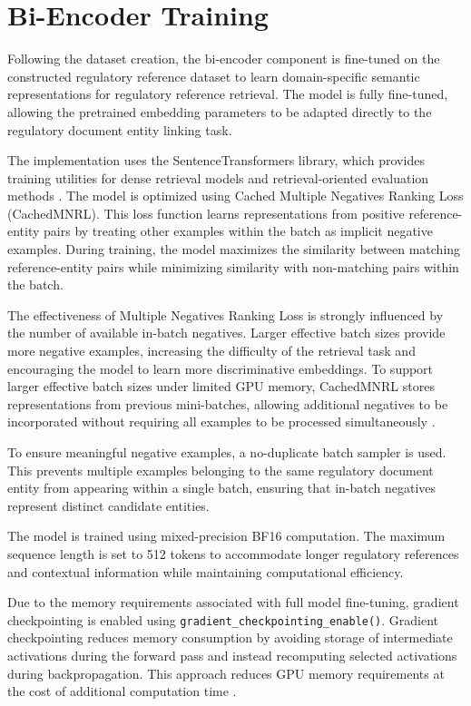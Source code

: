 \section{Bi-Encoder Training}

Following the dataset creation, the bi-encoder component is fine-tuned on the constructed regulatory reference dataset to learn domain-specific semantic representations for regulatory reference retrieval. The model is fully fine-tuned, allowing the pretrained embedding parameters to be adapted directly to the regulatory document entity linking task.

The implementation uses the SentenceTransformers library, which provides training utilities for dense retrieval models and retrieval-oriented evaluation methods \cite{reimers2019sentence}. The model is optimized using Cached Multiple Negatives Ranking Loss (CachedMNRL). This loss function learns representations from positive reference-entity pairs by treating other examples within the batch as implicit negative examples. During training, the model maximizes the similarity between matching reference-entity pairs while minimizing similarity with non-matching pairs within the batch.

The effectiveness of Multiple Negatives Ranking Loss is strongly influenced by the number of available in-batch negatives. Larger effective batch sizes provide more negative examples, increasing the difficulty of the retrieval task and encouraging the model to learn more discriminative embeddings. To support larger effective batch sizes under limited GPU memory, CachedMNRL stores representations from previous mini-batches, allowing additional negatives to be incorporated without requiring all examples to be processed simultaneously \cite{henderson2017efficient}.

To ensure meaningful negative examples, a no-duplicate batch sampler is used. This prevents multiple examples belonging to the same regulatory document entity from appearing within a single batch, ensuring that in-batch negatives represent distinct candidate entities.

The model is trained using mixed-precision BF16 computation. The maximum sequence length is set to 512 tokens to accommodate longer regulatory references and contextual information while maintaining computational efficiency.

Due to the memory requirements associated with full model fine-tuning, gradient checkpointing is enabled using \texttt{gradient\_checkpointing\_enable()}. Gradient checkpointing reduces memory consumption by avoiding storage of intermediate activations during the forward pass and instead recomputing selected activations during backpropagation. This approach reduces GPU memory requirements at the cost of additional computation time \cite{chen2016training}.

